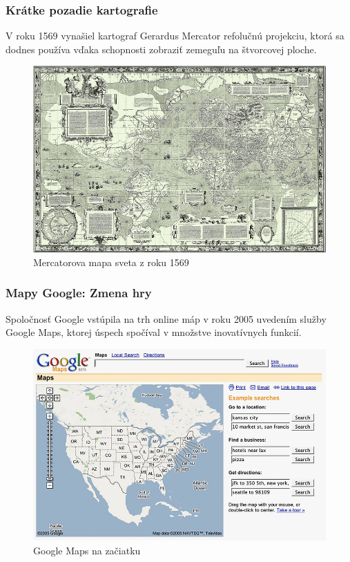 \documentclass{beamer}
\begin{document}
\begin{frame}[fragile=singleslide]\frametitle{Krátke pozadie kartografie}
V roku 1569 vynašiel kartograf Gerardus Mercator refolučnú projekciu, ktorá sa dodnes používa vďaka schopnosti zobraziť zemeguľu na štvorcovej ploche.
\begin{figure}[h]
	\centering
	\includegraphics[scale=0.25]{image1.png}
	\caption{Mercatorova mapa sveta z roku 1569}
	\label{fig:mercator}
\end{figure}
\end{frame}

\begin{frame}[fragile=singleslide]\frametitle{Mapy Google: Zmena hry}
Spoločnosť Google vstúpila na trh online máp v roku 2005 uvedením služby Google Maps, ktorej úspech spočíval v množstve inovatívnych funkcií.
\begin{figure}[h]
	\centering
	\includegraphics[scale=0.25]{image2.png}
	\caption{Google Maps na začiatku}
	\label{fig:googlemaps}
\end{figure}
\end{frame}
\end{document}
